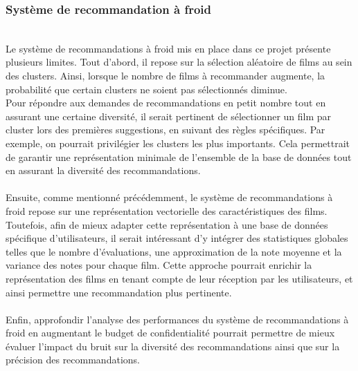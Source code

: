 \documentclass{article}
\begin{document}
\subsubsection{Système de recommandation à froid}
$ $\\
Le système de recommandations à froid mis en place dans ce projet présente plusieurs limites.
Tout d’abord, il repose sur la sélection aléatoire de films au sein des clusters. Ainsi, lorsque
le nombre de films à recommander augmente, la probabilité que certain clusters ne soient pas sélectionnés diminue.\\
Pour répondre aux demandes de recommandations en petit nombre tout en assurant une certaine diversité, il serait pertinent
de sélectionner un film par cluster lors des premières suggestions, en suivant des règles spécifiques. Par exemple, on
pourrait privilégier les clusters les plus importants. Cela permettrait de garantir une représentation minimale de l’ensemble
de la base de données tout en assurant la diversité des recommandations.\\
\\
Ensuite, comme mentionné précédemment, le système de recommandations à froid repose sur une représentation
vectorielle des caractéristiques des films. Toutefois, afin de mieux adapter cette représentation
à une base de données spécifique d’utilisateurs, il serait intéressant d’y intégrer des
statistiques globales telles que le nombre d’évaluations, une approximation de la note moyenne
et la variance des notes pour chaque film. Cette approche pourrait enrichir la représentation
des films en tenant compte de leur réception par les utilisateurs, et ainsi permettre une recommandation plus pertinente.\\
\\
Enfin, approfondir l'analyse des performances du système de recommandations à froid en augmentant le budget de confidentialité
pourrait permettre de mieux évaluer l'impact du bruit sur la diversité des recommandations ainsi que sur la précision des recommandations.
\end{document}
